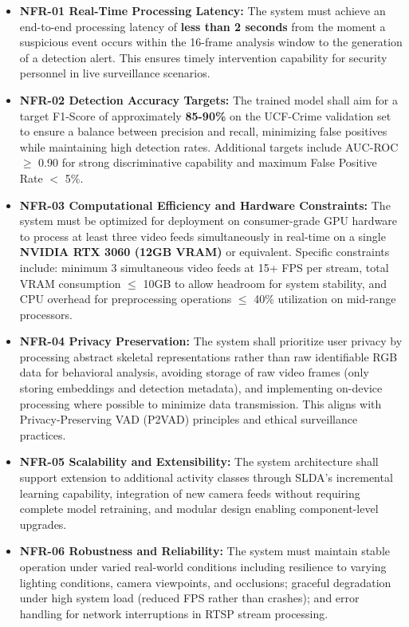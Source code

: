 \documentclass[12pt]{article}
\begin{document}
\begin{itemize}
    \item \textbf{NFR-01 Real-Time Processing Latency:} 
    The system must achieve an end-to-end processing latency of \textbf{less than 2 seconds} from the moment a suspicious event occurs within the 16-frame analysis window to the generation of a detection alert. This ensures timely intervention capability for security personnel in live surveillance scenarios.

    \item \textbf{NFR-02 Detection Accuracy Targets:} 
    The trained model shall aim for a target F1-Score of approximately \textbf{85-90\%} on the UCF-Crime validation set to ensure a balance between precision and recall, minimizing false positives while maintaining high detection rates. Additional targets include AUC-ROC $\geq$ 0.90 for strong discriminative capability and maximum False Positive Rate $<$ 5\%.

    \item \textbf{NFR-03 Computational Efficiency and Hardware Constraints:} 
    The system must be optimized for deployment on consumer-grade GPU hardware to process at least three video feeds simultaneously in real-time on a single \textbf{NVIDIA RTX 3060 (12GB VRAM)} or equivalent. Specific constraints include: minimum 3 simultaneous video feeds at 15+ FPS per stream, total VRAM consumption $\leq$ 10GB to allow headroom for system stability, and CPU overhead for preprocessing operations $\leq$ 40\% utilization on mid-range processors.

    \item \textbf{NFR-04 Privacy Preservation:}
    The system shall prioritize user privacy by processing abstract skeletal representations rather than raw identifiable RGB data for behavioral analysis, avoiding storage of raw video frames (only storing embeddings and detection metadata), and implementing on-device processing where possible to minimize data transmission. This aligns with Privacy-Preserving VAD (P2VAD) principles and ethical surveillance practices.

    \item \textbf{NFR-05 Scalability and Extensibility:}
    The system architecture shall support extension to additional activity classes through SLDA's incremental learning capability, integration of new camera feeds without requiring complete model retraining, and modular design enabling component-level upgrades.

    \item \textbf{NFR-06 Robustness and Reliability:}
    The system must maintain stable operation under varied real-world conditions including resilience to varying lighting conditions, camera viewpoints, and occlusions; graceful degradation under high system load (reduced FPS rather than crashes); and error handling for network interruptions in RTSP stream processing.
\end{itemize}
\end{document}
